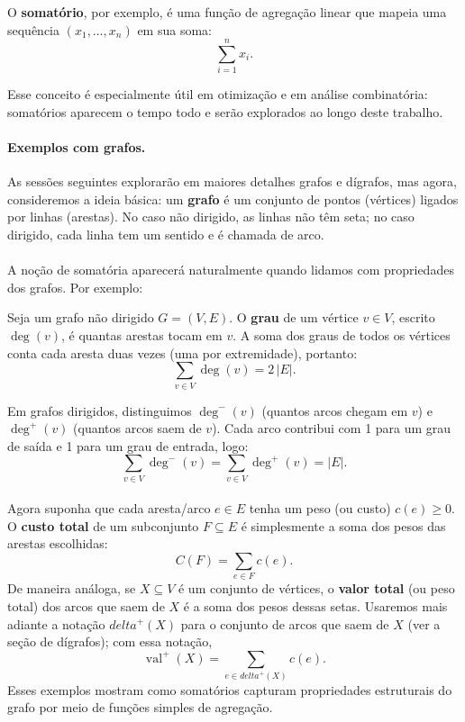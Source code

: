 \documentclass[12pt,a4paper]{article}
\def\emph#1{#1}%
\def\delta{delta}%
\begin{document}
O \textbf{somatório}, por exemplo, é uma função de agregação linear que mapeia uma sequência \((x_1,\dots,x_n)\) em sua soma:
\[\sum_{i=1}^{n} x_i.\]

Esse conceito é especialmente útil em otimização e em análise combinatória: somatórios aparecem o tempo todo e serão explorados ao longo deste trabalho.

\paragraph{Exemplos com grafos.}
As sessões seguintes explorarão em maiores detalhes grafos e dígrafos, mas agora, consideremos a ideia básica: um \textbf{grafo} é um conjunto de pontos (\emph{vértices}) ligados por linhas (\emph{arestas}). No caso \emph{não dirigido}, as linhas não têm seta; no caso \emph{dirigido}, cada linha tem um sentido e é chamada de \emph{arco}.

\paragraph{}
A noção de somatória aparecerá naturalmente quando lidamos com propriedades dos grafos. Por exemplo:

Seja um grafo não dirigido \(G=(V,E)\). O \textbf{grau} de um vértice \(v\in V\), escrito \(\deg(v)\), é quantas arestas tocam em \(v\). A soma dos graus de todos os vértices conta cada aresta \emph{duas vezes} (uma por extremidade), portanto:
\[\sum_{v\in V} \deg(v) = 2\,|E|.\]

Em grafos dirigidos, distinguimos \(\deg^{-}(v)\) (quantos arcos \emph{chegam} em \(v\)) e \(\deg^{+}(v)\) (quantos arcos \emph{saem} de \(v\)). Cada arco contribui com 1 para um grau de saída e 1 para um grau de entrada, logo:
\[\sum_{v\in V} \deg^{-}(v) = \sum_{v\in V} \deg^{+}(v) = |E|.\]

\paragraph{}
Agora suponha que cada aresta/arco \(e\in E\) tenha um \emph{peso} (ou \emph{custo}) \(c(e)\ge 0\). O \textbf{custo total} de um subconjunto \(F\subseteq E\) é simplesmente a soma dos pesos das arestas escolhidas:
\[C(F) = \sum_{e\in F} c(e).\]
De maneira análoga, se \(X\subseteq V\) é um conjunto de vértices, o \textbf{valor total} (ou peso total) dos arcos que \emph{saem} de \(X\) é a soma dos pesos dessas setas. Usaremos mais adiante a notação \(\delta^{+}(X)\) para o conjunto de arcos que saem de \(X\) (ver a seção de dígrafos); com essa notação,
\[\operatorname{val}^+(X) = \sum_{e\in \delta^{+}(X)} c(e).\]
Esses exemplos mostram como somatórios capturam propriedades estruturais do grafo por meio de funções simples de agregação.
\end{document}
